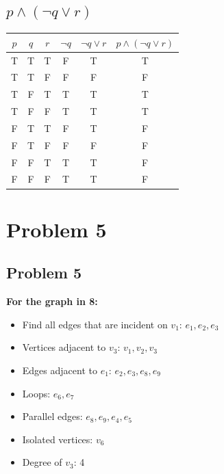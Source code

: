\documentclass[a4paper, 10pt]{article}
\begin{document}
        \subsection{\( p \land (\neg q \lor r) \)}
            \begin{tabular}{|c|c|c|c|c|c|}
                \hline
                \( p \) & \( q \) & \( r \) & \( \neg q \) & \( \neg q \lor r \) & \( p \land (\neg q \lor r) \) \\
                \hline
                T & T & T & F & T & T \\
                T & T & F & F & F & F \\
                T & F & T & T & T & T \\
                T & F & F & T & T & T \\
                F & T & T & F & T & F \\
                F & T & F & F & F & F \\
                F & F & T & T & T & F \\
                F & F & F & T & T & F \\
                \hline
            \end{tabular}

    \section{Problem 5}

    \subsection{Problem 5}

        \textbf{For the graph in 8:}
        \begin{itemize}
            \item Find all edges that are incident on \( v_1 \): \( e_1, e_2, e_3 \)
            \item Vertices adjacent to \( v_3 \): \( v_1, v_2, v_3 \)
            \item Edges adjacent to \( e_1 \): \( e_2, e_3, e_8, e_9\)
            \item Loops: \( e_6, e_7 \)
            \item Parallel edges: \( e_8, e_9, e_4, e_5 \)
            \item Isolated vertices: \( v_6 \)
            \item Degree of \( v_3 \): 4
        \end{itemize}
\end{document}
